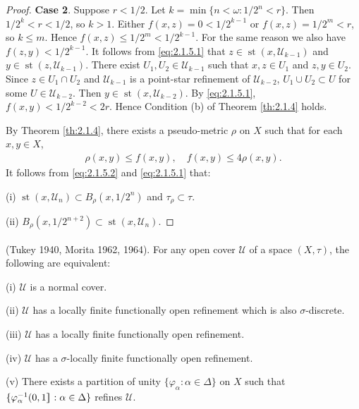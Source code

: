 \documentclass[main.tex]{subfiles}
\begin{document}
\begin{proof}
\textbf{Case 2}. Suppose $r <1/2$. Let $k = \min\{n< \omega: 1/{2^n} < r\}$.
	Then $1/{2^k} < r < 1/2$, so $k > 1$. Either $f(x, z) = 0 < 1/{2^{k-1}}$ or 
	$f(x, z) = 1/{2^m} < r$, so $k \le m$. Hence $f(x, z) \le 1/{2^m} < 1/2^{k-1}$.
	For the same reason we also have $f(z, y) < 1/{2^{k-1}}$. 
	It follows from \eqref{eq:2.1.5.1} that $z \in \operatorname{st}(x, \mathscr{U}_{k-1})$ 
	and $y \in \operatorname{st}(z, \mathscr{U}_{k-1})$. 
	There exist $U_1, U_2 \in \mathscr{U}_{k-1}$ such that $x, z \in U_1$ 
	and $z, y \in U_2$. Since $z \in U_1 \cap U_2$ 
	and $\mathscr{U}_{k-1}$ is a point-star refinement of $\mathscr{U}_{k-2}$, 
	$U_1 \cup U_2 \subset U$ for some $U \in \mathscr{U}_{k-2}$. 
	Then $y \in \operatorname{st}(x, \mathscr{U}_{k-2})$. 
	By \eqref{eq:2.1.5.1}, 
	$f(x, y) < 1/{2^{k-2}} < 2r$.
	Hence Condition (b) of Theorem \ref{th:2.1.4} holds.
	
	By Theorem \ref{th:2.1.4}, there exists a pseudo-metric $\rho$ on $X$ such that for each $x, y \in X$,
	\begin{gather}
		\rho(x, y) \le f(x, y), \quad
		f(x, y) \le 4\rho(x, y). \label{eq:2.1.5.2}
	\end{gather}
	It follows from \eqref{eq:2.1.5.2} and \eqref{eq:2.1.5.1} that:
	
	\textup{(i)} $\operatorname{st}(x, \mathscr{U}_n) \subset B_\rho(x,1/{2^n})$ and $\tau_\rho \subset \tau$.
	
	\textup{(ii)} $B_\rho(x, 1/{2^{n+2}}) \subset \operatorname{st}(x, \mathscr{U}_n)$.
\end{proof}

{\theorem{\label{th:2.1.6}}
	\textup{(\hstretch{1.8}{[}Tukey 1940\hstretch{1.8}{]}\textsuperscript{\cite{Tukey}}, 
		\hstretch{1.8}{[}Morita 1962, 1964\hstretch{1.8}{]}\textsuperscript{\cite{Morita1962}\cite{Morita1964}})}. 
	For any open cover $\mathscr{U}$ of a space $(X, \tau)$, 
	the following are equivalent:
	
	\textup{(i)}   $\mathscr{U}$ is a normal cover.
	
	\textup{(ii)}  $\mathscr{U}$ has a locally finite  functionally open refinement 
	which is also $\sigma$-discrete.
	
	\textup{(iii)}  $\mathscr{U}$ has a locally finite functionally open refinement.
	
	\textup{(iv)}  $\mathscr{U}$ has a $\sigma$-locally finite functionally open refinement.
	
	\textup{(v)}  There exists a partition of unity $\{\varphi_\alpha: \alpha \in \Delta\}$ on $X$ 
	such that $\{\varphi_\alpha^{-1}(0, 1\hstretch{1.8}{]}: \alpha \in \Delta\}$ refines $\mathscr{U}$.
}
\end{document}
